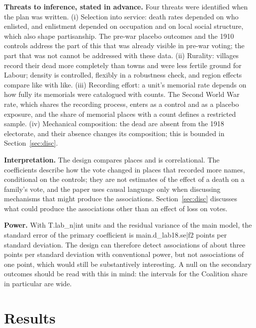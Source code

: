 \documentclass[11pt,a4paper]{article}
\begin{document}
\textbf{Threats to inference, stated in advance.} Four threats were identified when the plan was written. (i) Selection into service: death rates depended on who enlisted, and enlistment depended on occupation and on local social structure, which also shape partisanship. The pre-war placebo outcomes and the 1910 controls address the part of this that was already visible in pre-war voting; the part that was not cannot be addressed with these data. (ii) Rurality: villages record their dead more completely than towns and were less fertile ground for Labour; density is controlled, flexibly in a robustness check, and region effects compare like with like. (iii) Recording effort: a unit's memorial rate depends on how fully its memorials were catalogued with counts. The Second World War rate, which shares the recording process, enters as a control and as a placebo exposure, and the share of memorial places with a count defines a restricted sample. (iv) Mechanical composition: the dead are absent from the 1918 electorate, and their absence changes its composition; this is bounded in Section~\ref{sec:disc}.

\textbf{Interpretation.} The design compares places and is correlational. The coefficients describe how the vote changed in places that recorded more names, conditional on the controls; they are not estimates of the effect of a death on a family's vote, and the paper uses causal language only when discussing mechanisms that might produce the associations. Section~\ref{sec:disc} discusses what could produce the associations other than an effect of loss on votes.

\textbf{Power.} With {{T.lab_n|int}} units and the residual variance of the main model, the standard error of the primary coefficient is {{main.d_lab18.se|f2}} points per standard deviation. The design can therefore detect associations of about three points per standard deviation with conventional power, but not associations of one point, which would still be substantively interesting. A null on the secondary outcomes should be read with this in mind: the intervals for the Coalition share in particular are wide.

\section{Results}
\end{document}

